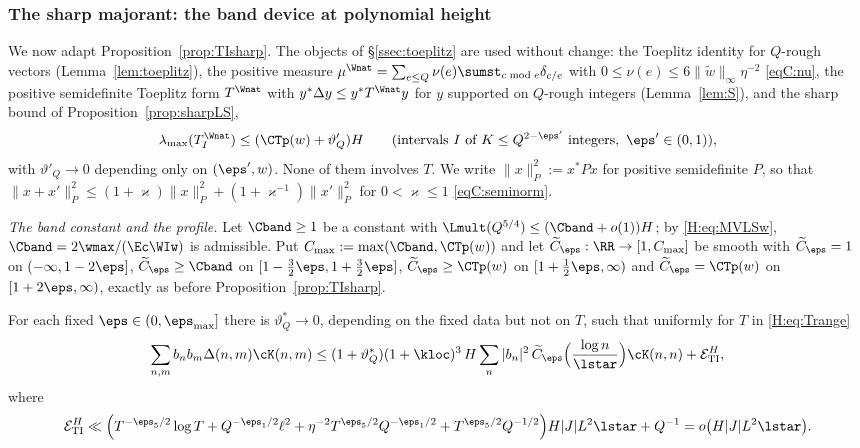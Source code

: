 \subsubsection*{The sharp majorant: the band device at polynomial height}
We now adapt Proposition~\ref{prop:TIsharp}. The objects of \S\ref{ssec:toeplitz} are used without change: the Toeplitz identity for $Q$-rough vectors (Lemma~\ref{lem:toeplitz}), the positive measure $\mu^\Wnat=\sum_{e\le Q}\nu(e)\sumst_{c\bmod e}\delta_{c/e}$ with $0\le\nu(e)\le6\|\widetilde w\|_\infty\eta^{-2}$ \eqref{eqC:nu}, the positive semidefinite Toeplitz form $T^\Wnat$ with $y^*\Delta y\le y^*T^\Wnat y$ for $y$ supported on $Q$-rough integers (Lemma~\ref{lem:S}), and the sharp bound of Proposition~\ref{prop:sharpLS},
\begin{equation}\label{H:eq:sharpLS}
\lambda_{\max}(T^\Wnat_I)\le(\CTp(w)+\vartheta'_Q)H\qquad(\text{intervals }I\text{ of }K\le Q^{2-\eps'}\text{ integers},\ \eps'\in(0,1)),
\end{equation}
with $\vartheta'_Q\to0$ depending only on $(\eps',w)$. None of them involves $T$. We write $\|x\|_P^2:=x^*Px$ for positive semidefinite $P$, so that $\|x+x'\|_P^2\le(1+\varkappa)\|x\|_P^2+(1+\varkappa^{-1})\|x'\|_P^2$ for $0<\varkappa\le1$ \eqref{eqC:seminorm}.

\emph{The band constant and the profile.} Let $\Cband\ge1$ be a constant with $\Lmult(Q^{5/4})\le(\Cband+o(1))H$; by \eqref{H:eq:MVLSw}, $\Cband=2\wmax/(\Ec\WIw)$ is admissible. Put $C_{\max}:=\max(\Cband,\CTp(w))$ and let $\widetilde C_\eps:\RR\to[1,C_{\max}]$ be smooth with $\widetilde C_\eps=1$ on $(-\infty,1-2\eps]$, $\widetilde C_\eps\ge\Cband$ on $[1-\frac32\eps,1+\frac32\eps]$, $\widetilde C_\eps\ge\CTp(w)$ on $[1+\frac12\eps,\infty)$ and $\widetilde C_\eps=\CTp(w)$ on $[1+2\eps,\infty)$, exactly as before Proposition~\ref{prop:TIsharp}.

\begin{proposition}\label{H:prop:TIsharp}
For each fixed $\eps\in(0,\eps_{\max}]$ there is $\vartheta^*_Q\to0$, depending on the fixed data but not on $T$, such that uniformly for $T$ in \eqref{H:eq:Trange}
\[
\sum_{n,m}b_nb_m\Delta(n,m)\cK(n,m)\le(1+\vartheta^*_Q)(1+\kloc)^3\,H\sum_n|b_n|^2\,\widetilde C_\eps\Big(\frac{\log n}{\lstar}\Big)\cK(n,n)+\mathcal E^{H}_{\rm TI},
\]
where
\[
\mathcal E^{H}_{\rm TI}\ll\Big(T^{-\eps_5/2}\log T+Q^{-\eps_1/2}\ell^2+\eta^{-2}T^{\eps_5/2}Q^{-\eps_1/2}+T^{\eps_5/2}Q^{-1/2}\Big)H|J|L^2\lstar+Q^{-1}=o\big(H|J|L^2\lstar\big).
\]
\end{proposition}


